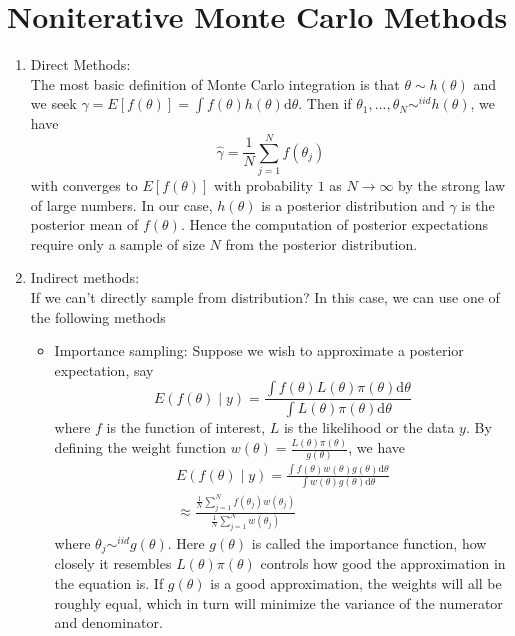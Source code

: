 \documentclass[lecture,12pt,]{pcms-l}
\numberwithin{section}{chapter}
\numberwithin{equation}{chapter}
\theoremstyle{plain}
\theoremstyle{definition}
\theoremstyle{definition}
\begin{document}
\section{Noniterative Monte Carlo Methods}
\begin{enumerate}
\item Direct Methods:
\\
The most basic definition of Monte Carlo integration is that  $\theta \sim h(\theta)$ and we seek $\gamma = E \left [  f(\theta)\right ]=\int f(\theta) h(\theta) \mathrm{d} \theta$. Then if $\theta_1,...,\theta_N \sim^{iid} h(\theta)$, we have
\begin{equation}
\hat{\gamma}=\frac{1}{N}\sum_{j=1}^{N}f(\theta_j)
\end{equation}
with converges to $E \left [  f(\theta)\right ]$ with probability $1$ as $N\rightarrow \infty$ by the strong law of large numbers. In our case, $h(\theta)$ is a posterior distribution and $\gamma$ is the posterior mean of $f(\theta)$. Hence the computation of posterior expectations require only a sample of size $N$ from the posterior distribution.
\item Indirect methods:
\\
If we can't directly sample from distribution? In this case, we can use one of the following methods
\begin{itemize}
\item Importance sampling: Suppose we wish to approximate a posterior expectation, say 
\begin{equation}
E(f(\theta) \mid y)=\frac{\int f(\theta) L(\theta) \pi(\theta) \mathrm{d} \theta}{\int L(\theta)\pi(\theta) \mathrm{d} \theta}
\end{equation}
where $f$ is the function of interest, $L$ is the likelihood or the data $y$. By defining the weight function $w(\theta)=\frac{L(\theta)\pi(\theta)}{g(\theta)}$, we have
\begin{equation}
\begin{split}
E(f(\theta) \mid y)=\frac{\int f(\theta) w(\theta) g(\theta) \mathrm{d} \theta}{\int w(\theta)g(\theta) \mathrm{d} \theta}
\\
\approx \frac{\frac{1}{N} \sum_{j=1}^{N}f(\theta_j)w(\theta_j)}{\frac{1}{N} \sum_{j=1}^{N}w(\theta_j)}
\end{split}
\end{equation} 
where $\theta_j \sim^{iid} g(\theta)$. Here $g(\theta)$ is called the importance function, how closely it resembles $L(\theta) \pi(\theta)$ controls how good the approximation in the equation is. If $g(\theta)$ is a good approximation, the weights will all be roughly equal, which in turn will minimize the variance of the numerator and denominator. 


\end{itemize}
\end{enumerate}
\end{document}
